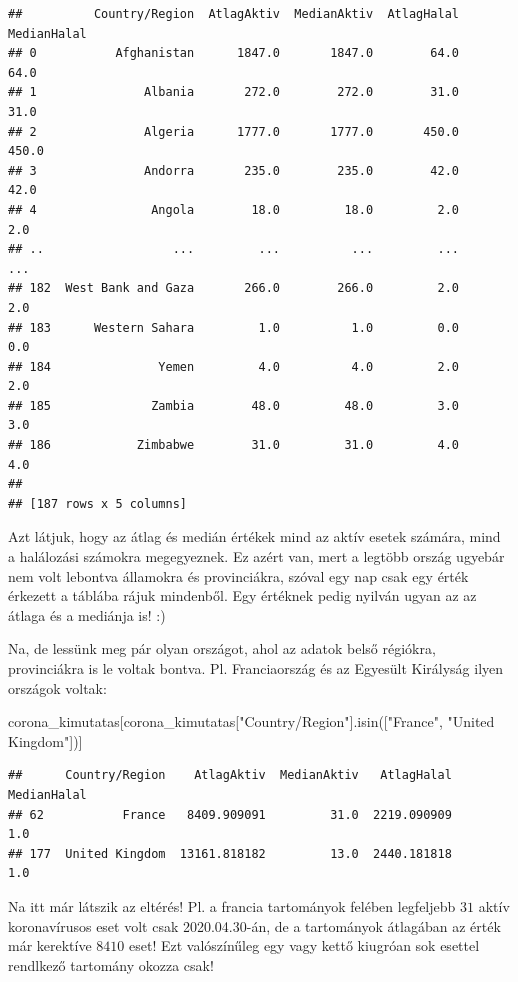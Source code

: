 \documentclass[
]{book}
\newenvironment{Shaded}{\begin{snugshade}}{\end{snugshade}}
\newcommand{\NormalTok}[1]{#1}
\newcommand{\StringTok}[1]{\textcolor[rgb]{0.31,0.60,0.02}{#1}}
\begin{document}
\begin{verbatim}
##          Country/Region  AtlagAktiv  MedianAktiv  AtlagHalal  MedianHalal
## 0           Afghanistan      1847.0       1847.0        64.0         64.0
## 1               Albania       272.0        272.0        31.0         31.0
## 2               Algeria      1777.0       1777.0       450.0        450.0
## 3               Andorra       235.0        235.0        42.0         42.0
## 4                Angola        18.0         18.0         2.0          2.0
## ..                  ...         ...          ...         ...          ...
## 182  West Bank and Gaza       266.0        266.0         2.0          2.0
## 183      Western Sahara         1.0          1.0         0.0          0.0
## 184               Yemen         4.0          4.0         2.0          2.0
## 185              Zambia        48.0         48.0         3.0          3.0
## 186            Zimbabwe        31.0         31.0         4.0          4.0
## 
## [187 rows x 5 columns]
\end{verbatim}

Azt látjuk, hogy az átlag és medián értékek mind az aktív esetek számára, mind a halálozási számokra megegyeznek. Ez azért van, mert a legtöbb ország ugyebár nem volt lebontva államokra és provinciákra, szóval egy nap csak egy érték érkezett a táblába rájuk mindenből. Egy értéknek pedig nyilván ugyan az az átlaga és a mediánja is! :)

Na, de lessünk meg pár olyan országot, ahol az adatok belső régiókra, provinciákra is le voltak bontva. Pl. Franciaország és az Egyesült Királyság ilyen országok voltak:

\begin{Shaded}
\begin{Highlighting}[]
\NormalTok{corona\_kimutatas[corona\_kimutatas[}\StringTok{"Country/Region"}\NormalTok{].isin([}\StringTok{"France"}\NormalTok{, }\StringTok{"United Kingdom"}\NormalTok{])]}
\end{Highlighting}
\end{Shaded}

\begin{verbatim}
##      Country/Region    AtlagAktiv  MedianAktiv   AtlagHalal  MedianHalal
## 62           France   8409.909091         31.0  2219.090909          1.0
## 177  United Kingdom  13161.818182         13.0  2440.181818          1.0
\end{verbatim}

Na itt már látszik az eltérés! Pl. a francia tartományok felében legfeljebb \(31\) aktív koronavírusos eset volt csak 2020.04.30-án, de a tartományok átlagában az érték már kerektíve \(8410\) eset! Ezt valószínűleg egy vagy kettő kiugróan sok esettel rendlkező tartomány okozza csak!
\end{document}
